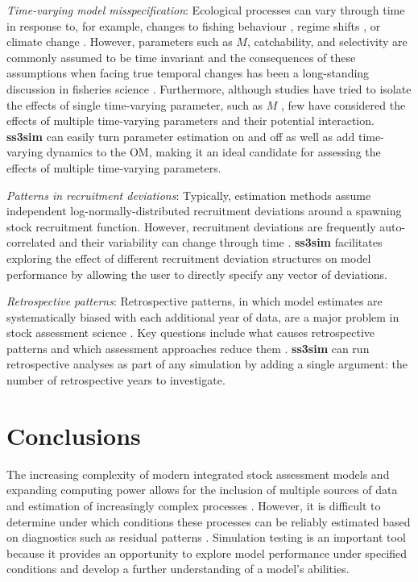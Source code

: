 \documentclass[10pt]{article}
\newcommand{\R}[1]{\label{#1}\linelabel{#1}}
\begin{document}
\emph{Time-varying model misspecification}: Ecological processes can vary
through time in response to, for example, changes to fishing behaviour
\cite{hilborn1992}, regime shifts \cite{vert-pre2013}, or climate change
\cite{walther2002}. However, parameters such as $M$, catchability, and
selectivity are commonly assumed to be time invariant and the consequences of
these assumptions when facing true temporal changes has been a long-standing
discussion in fisheries science \cite{royama1992, wilberg2006, fu2001}.
Furthermore, although studies have tried to isolate the effects of single
time-varying parameter, such as $M$ \cite{lee2011, jiao2012, deroba2013,
  johnson2014}, few have considered the effects of multiple time-varying
parameters and their potential interaction. \textbf{ss3sim} can easily turn
parameter estimation on and off as well as add time-varying dynamics to the OM,
making it an ideal candidate for assessing the effects of multiple time-varying
parameters.

\emph{Patterns in recruitment deviations}: Typically, estimation methods assume
independent log-normally-distributed recruitment deviations around a spawning
stock recruitment function. However, recruitment deviations are frequently
auto-correlated and their variability can change through time
\cite{beamish1995, pyper1998}. \R{B26}\textbf{ss3sim} facilitates exploring the
effect of different recruitment deviation structures on model performance by
allowing the user to directly specify any vector of deviations.

\emph{Retrospective patterns}: Retrospective patterns, in which model estimates
are systematically biased with each additional year of data, are a major
problem in stock assessment science \cite{mohn1999, legault2008}. Key questions
include what causes retrospective patterns and which assessment approaches reduce
them \cite{legault2008}. \textbf{ss3sim} can run retrospective analyses as part
of any simulation by adding a single argument: the number of retrospective
years to investigate.

\section*{Conclusions}

The increasing complexity of modern integrated stock assessment models and
expanding computing power allows for the inclusion of multiple sources of data
and estimation of increasingly complex processes \cite{maunder2013}. However,
it is difficult to determine under which conditions these processes can be
reliably estimated based on diagnostics such as residual patterns
\cite{maunder2013}. Simulation testing is an important tool because it provides
an opportunity to explore model performance under specified conditions and
develop a further understanding of a model's abilities.
\end{document}
